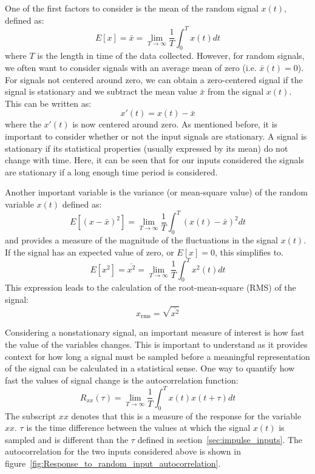 \documentclass[12pt,letter]{article}
\begin{document}
One of the first factors to consider is the mean of the random signal $x(t)$, defined as:
\begin{equation}
E[x] = \bar{x} = \lim\limits_{T \rightarrow \infty} \frac{1}{T} \int_{0}^{T}x(t)dt
\end{equation}
where $T$ is the length in time of the data collected. However, for random signals, we often want to consider signals with an average mean of zero (i.e. $\bar{x}(t)=0$). For signals not centered around zero, we can obtain a zero-centered signal if the signal is stationary and we subtract the mean value $\bar{x}$ from the signal $x(t)$. This can be written as:
\begin{equation}
x'(t) = x(t) - \bar{x}
\end{equation} 
where the $x'(t)$ is now centered around zero. As mentioned before, it is important to consider whether or not the input signals are stationary. A signal is stationary if its statistical properties (usually expressed by its mean) do not change with time. Here, it can be seen that for our inputs considered the signals are stationary if a long enough time period is considered. 

Another important variable is the variance (or mean-square value) of the random variable $x(t)$ defined as:
\begin{equation}
E[(x-\bar{x})^2] = \lim\limits_{T \rightarrow \infty} \frac{1}{T} \int_{0}^{T}(x(t)-\bar{x})^2dt
\end{equation}
and provides a measure of the magnitude of the fluctuations in the signal $x(t)$. If the signal has an expected value of zero, or $E[x]=0$, this simplifies to. 
\begin{equation}
E[x^2] = \overline{x^2} = \lim\limits_{T \rightarrow \infty} \frac{1}{T} \int_{0}^{T}x^2(t)dt
\end{equation}
This expression leads to the calculation of the root-mean-square (RMS) of the signal:
\begin{equation}
x_\text{rms} = \sqrt{\overline{x^2}} 
\end{equation}

Considering a nonstationary signal, an important measure of interest is how fast the value of the variables changes. This is important to understand as it provides context for how long a signal must be sampled before a meaningful representation of the signal can be calculated in a statistical sense. One way to quantify how fast the values of signal change is the autocorrelation function: 
\begin{equation}
R_{xx}(\tau) = \lim\limits_{T \rightarrow \infty} \frac{1}{T} \int_{0}^{T}x(t)x(t+\tau)dt
\end{equation}
The subscript $xx$ denotes that this is a measure of the response for the variable $xx$. $\tau$ is the time difference between the values at which the signal $x(t)$ is sampled and is different than the $\tau$ defined in section~\ref{sec:impulse_inputs}. The autocorrelation for the two inputs considered above is shown in figure~\ref{fig:Response_to_random_input_autocorrelation}.
			
\end{document}
